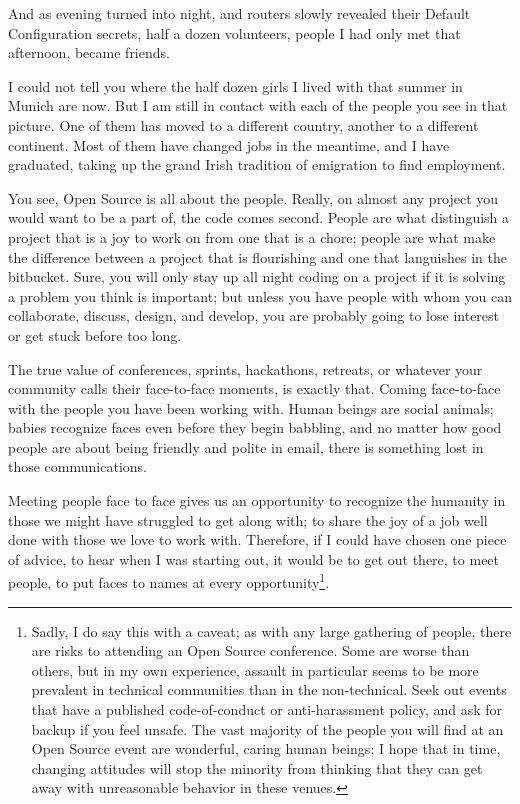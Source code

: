 And as evening turned into night, and routers slowly revealed their
Default Configuration secrets, half a dozen volunteers, people I had
only met that afternoon, became friends.

I could not tell you where the half dozen girls I lived with that
summer in Munich are now. But I am still in contact with each of the
people you see in that picture. One of them has moved to a different
country, another to a different continent. Most of them have changed
jobs in the meantime, and I have graduated, taking up the grand Irish
tradition of emigration to find employment.

You see, Open Source is all about the people. Really, on almost any
project you would want to be a part of, the code comes second. People are
what distinguish a project that is a joy to work on from one that is a
chore; people are what make the difference between a project that is
flourishing and one that languishes in the bitbucket. Sure, you will
only stay up all night coding on a project if it is solving a problem
you think is important; but unless you have people with whom you can
collaborate, discuss, design, and develop, you are probably going to
lose interest or get stuck before too long.

The true value of conferences, sprints, hackathons, retreats, or
whatever your community calls their face-to-face moments, is exactly
that. Coming face-to-face with the people you have been working with.
Human beings are social animals; babies recognize faces even before
they begin babbling, and no matter how good people are about being
friendly and polite in email, there is something lost in those
communications.

Meeting people face to face gives us an opportunity to recognize the
humanity in those we might have struggled to get along with; to share
the joy of a job well done with those we love to work with. Therefore,
if I could have chosen one piece of advice, to hear when I was
starting out, it would be to get out there, to meet people, to put
faces to names at every opportunity\footnote{Sadly, I do say this with a caveat;
as with any large gathering of
people, there are risks to attending an Open Source conference. Some
are worse than others, but in my own experience, assault in particular
seems to be more prevalent in technical communities than in the
non-technical. Seek out events that have a published code-of-conduct
or anti-harassment policy, and ask for backup if you feel unsafe. The
vast majority of the people you will find at an Open Source event are
wonderful, caring human beings; I hope that in time, changing
attitudes will stop the minority from thinking that they can get away
with unreasonable behavior in these venues.}.

